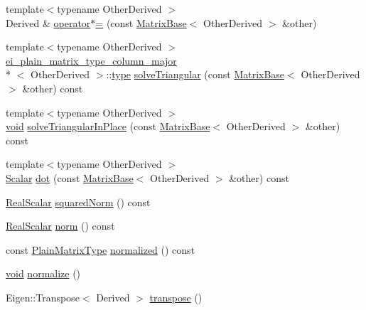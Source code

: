 \begin{DoxyCompactItemize}
{\footnotesize template$<$typename Other\-Derived $>$ }\\Derived \& \hyperlink{class_matrix_base_ae4288c54bcd1b9d64f95ac61a3d418f8}{operator$\ast$=} (const \hyperlink{class_matrix_base}{Matrix\-Base}$<$ Other\-Derived $>$ \&other)
\item 
{\footnotesize template$<$typename Other\-Derived $>$ }\\\hyperlink{structei__plain__matrix__type__column__major}{ei\-\_\-plain\-\_\-matrix\-\_\-type\-\_\-column\-\_\-major}\\*
$<$ Other\-Derived $>$\-::\hyperlink{glext_8h_a7d05960f4f1c1b11f3177dc963a45d86}{type} \hyperlink{class_matrix_base_aa338f29b37898b2104b39c32b6854a65}{solve\-Triangular} (const \hyperlink{class_matrix_base}{Matrix\-Base}$<$ Other\-Derived $>$ \&other) const 
\item 
{\footnotesize template$<$typename Other\-Derived $>$ }\\\hyperlink{group___u_a_v_objects_plugin_ga444cf2ff3f0ecbe028adce838d373f5c}{void} \hyperlink{class_matrix_base_ab7a4ee6e139cf49ea84cf1c39d87d8ce}{solve\-Triangular\-In\-Place} (const \hyperlink{class_matrix_base}{Matrix\-Base}$<$ Other\-Derived $>$ \&other) const 
\item 
{\footnotesize template$<$typename Other\-Derived $>$ }\\\hyperlink{class_matrix_base_a625df8339dc2d816cbc0fd66e7dadaf5}{Scalar} \hyperlink{class_matrix_base_abeefd7027bd8e58859c546430dd98683}{dot} (const \hyperlink{class_matrix_base}{Matrix\-Base}$<$ Other\-Derived $>$ \&other) const 
\item 
\hyperlink{class_matrix_base_a634804c67de40fec74e3640bc229364c}{Real\-Scalar} \hyperlink{class_matrix_base_a87e14260e8d43d5578c6721c1ad6d3df}{squared\-Norm} () const 
\item 
\hyperlink{class_matrix_base_a634804c67de40fec74e3640bc229364c}{Real\-Scalar} \hyperlink{class_matrix_base_ab227b26a58ab1cb0f23451a8c856c411}{norm} () const 
\item 
const \hyperlink{class_matrix_base_aa6a23b3d1aac2a1b4b9d8bcb54e1e2bc}{Plain\-Matrix\-Type} \hyperlink{class_matrix_base_a65f587dc428711338002878c561bff6f}{normalized} () const 
\item 
\hyperlink{group___u_a_v_objects_plugin_ga444cf2ff3f0ecbe028adce838d373f5c}{void} \hyperlink{class_matrix_base_a5502971e5f38762b7c4e14e8e918a08c}{normalize} ()
\item 
Eigen\-::\-Transpose$<$ Derived $>$ \hyperlink{class_matrix_base_a794fe4b04caa197931bb688ce0dc7e43}{transpose} ()

\end{DoxyCompactItemize}
